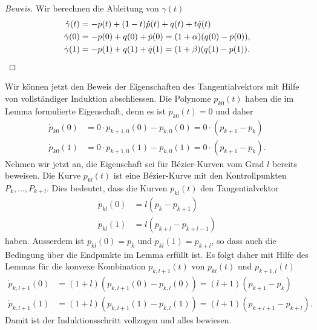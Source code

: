 \begin{proof}[Beweis]
Wir berechnen die Ableitung von $\gamma(t)$
\begin{align*}
\dot{\gamma}(t)
&=
-p(t) + (1-t)\dot{p}(t) + q(t) + t\dot{q}(t)
\\
\dot{\gamma}(0)
&=
-p(0) + q(0) + \dot{p}(0)
=
(1+\alpha)(q(0)-p(0)),
\\
\dot{\gamma}(1)&=-p(1) + q(1) + \dot{q}(1)
=
(1+\beta)(q(1)-p(1)).
\qedhere
\end{align*}
\end{proof}

Wir können jetzt den Beweis der Eigenschaften des Tangentialvektors
mit Hilfe von vollständiger Induktion abschliessen.
Die Polynome $p_{k0}(t)$ haben die im Lemma formulierte Eigenschaft,
denn es ist
$\dot{p}_{k0}(t) = 0$
und daher
\begin{align*}
\dot{p}_{k0}(0)
&=
0\cdot p_{k+1,0}(0) - p_{k,0}(0) = 0\cdot(p_{k+1}-p_{k})
\\
\dot{p}_{k0}(1)
&=
0\cdot p_{k+1,0}(1) - p_{k,0}(1) = 0\cdot(p_{k+1}-p_{k}).
\end{align*}
Nehmen wir jetzt an, die Eigenschaft sei für Bézier-Kurven vom Grad $l$
bereits beweisen.
Die Kurve $p_{kl}(t)$ ist eine Bézier-Kurve mit den Kontrollpunkten
$P_k,\dots,P_{k+l}$.
Dies bedeutet, dass die Kurven $p_{kl}(t)$ den Tangentialvektor
\begin{align*}
\dot{p}_{kl}(0)&= l(p_{k}-p_{k+1}) \\
\dot{p}_{kl}(1)&= l(p_{k+l}-p_{k+l-1})
\end{align*}
haben.
Ausserdem ist $p_{kl}(0) = p_k$ und $p_{kl}(1) = p_{k+l}$, so dass auch
die Bedingung über die Endpunkte im Lemma erfüllt ist.
Es folgt daher mit Hilfe des Lemmas für die konvexe Kombination $p_{k,l+1}(t)$
von $p_{kl}(t)$ und $p_{k+1,l}(t)$
\begin{align*}
\dot{p}_{k,l+1}(0)
&=
(1+l)(p_{k,l+1}(0) - p_{k,l}(0))
=
(l+1)(p_{k+1} - p_{k})
\\
\dot{p}_{k,l+1}(1)
&=
(1+l)(p_{k,l+1}(1) - p_{k,l}(1))
=
(l+1)(p_{k+l+1}-p_{k+l}).
\end{align*}
Damit ist der Induktionsschritt vollzogen und alles bewiesen.

